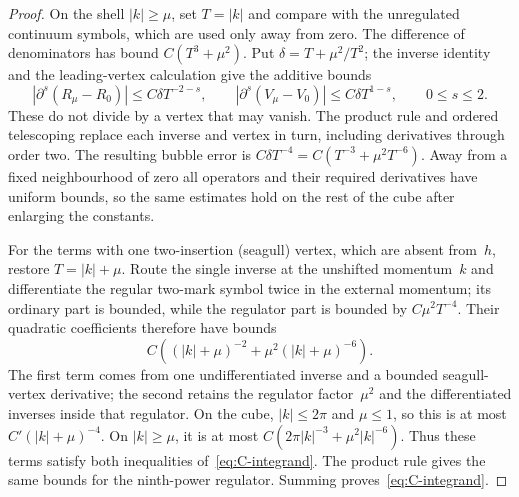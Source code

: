 \begin{proof}
On the shell $|k|\ge\mu$, set $T=|k|$ and compare with the unregulated continuum symbols, which are used only away from zero. The difference of denominators has bound $C(T^3+\mu^2)$. Put $\delta=T+\mu^2/T^2$; the inverse identity and the leading-vertex calculation give the additive bounds
\begin{equation*}
|\partial^s(R_\mu-R_0)|\le C\delta T^{-2-s},\qquad
|\partial^s(V_\mu-V_0)|\le C\delta T^{1-s},\qquad 0\le s\le2.
\end{equation*}
These do not divide by a vertex that may vanish. The product rule and ordered telescoping replace each inverse and vertex in turn, including derivatives through order two. The resulting bubble error is $C\delta T^{-4}=C(T^{-3}+\mu^2T^{-6})$. Away from a fixed neighbourhood of zero all operators and their required derivatives have uniform bounds, so the same estimates hold on the rest of the cube after enlarging the constants.

For the terms with one two-insertion (seagull) vertex, which are absent from~$h$, restore $T=|k|+\mu$. Route the single inverse at the unshifted momentum~$k$ and differentiate the regular two-mark symbol twice in the external momentum; its ordinary part is bounded, while the regulator part is bounded by $C\mu^2T^{-4}$. Their quadratic coefficients therefore have bounds
\begin{equation*}
C\left((|k|+\mu)^{-2}+\mu^2(|k|+\mu)^{-6}\right).
\end{equation*}
The first term comes from one undifferentiated inverse and a bounded seagull-vertex derivative; the second retains the regulator factor~$\mu^2$ and the differentiated inverses inside that regulator. On the cube, $|k|\le2\pi$ and $\mu\le1$, so this is at most $C'(|k|+\mu)^{-4}$. On $|k|\ge\mu$, it is at most $C(2\pi|k|^{-3}+\mu^2|k|^{-6})$. Thus these terms satisfy both inequalities of~\eqref{eq:C-integrand}. The product rule gives the same bounds for the ninth-power regulator. Summing proves~\eqref{eq:C-integrand}.


\end{proof}
